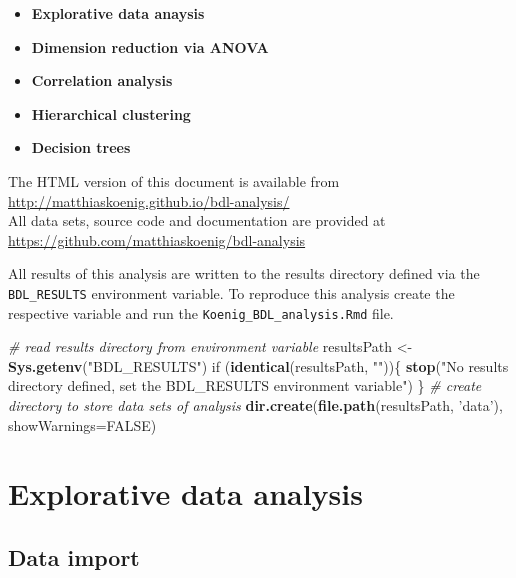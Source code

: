 \documentclass[]{article}
\newenvironment{Shaded}{\begin{snugshade}}{\end{snugshade}}
\newcommand{\KeywordTok}[1]{\textcolor[rgb]{0.13,0.29,0.53}{\textbf{{#1}}}}
\newcommand{\DataTypeTok}[1]{\textcolor[rgb]{0.13,0.29,0.53}{{#1}}}
\newcommand{\StringTok}[1]{\textcolor[rgb]{0.31,0.60,0.02}{{#1}}}
\newcommand{\CommentTok}[1]{\textcolor[rgb]{0.56,0.35,0.01}{\textit{{#1}}}}
\newcommand{\OtherTok}[1]{\textcolor[rgb]{0.56,0.35,0.01}{{#1}}}
\newcommand{\NormalTok}[1]{{#1}}
\begin{document}
\begin{itemize}
\itemsep1pt\parskip0pt
\item
  \textbf{Explorative data anaysis}
\item
  \textbf{Dimension reduction via ANOVA}
\item
  \textbf{Correlation analysis}
\item
  \textbf{Hierarchical clustering}
\item
  \textbf{Decision trees}
\end{itemize}

The HTML version of this document is available
from\\\url{http://matthiaskoenig.github.io/bdl-analysis/}\\All data
sets, source code and documentation are provided
at\\\url{https://github.com/matthiaskoenig/bdl-analysis}

All results of this analysis are written to the results directory
defined via the \texttt{BDL\_RESULTS} environment variable. To reproduce
this analysis create the respective variable and run the
\texttt{Koenig\_BDL\_analysis.Rmd} file.

\begin{Shaded}
\begin{Highlighting}[]
\CommentTok{# read results directory from environment variable}
\NormalTok{resultsPath <-}\StringTok{ }\KeywordTok{Sys.getenv}\NormalTok{(}\StringTok{"BDL_RESULTS"}\NormalTok{)}
\NormalTok{if (}\KeywordTok{identical}\NormalTok{(resultsPath, }\StringTok{""}\NormalTok{))\{}
  \KeywordTok{stop}\NormalTok{(}\StringTok{"No results directory defined, set the BDL_RESULTS environment variable"}\NormalTok{)}
\NormalTok{\}}
\CommentTok{# create directory to store data sets of analysis}
\KeywordTok{dir.create}\NormalTok{(}\KeywordTok{file.path}\NormalTok{(resultsPath, }\StringTok{'data'}\NormalTok{), }\DataTypeTok{showWarnings=}\OtherTok{FALSE}\NormalTok{)}
\end{Highlighting}
\end{Shaded}

\section{Explorative data analysis}\label{explorative-data-analysis}

\subsection{Data import}\label{data-import}
\end{document}

